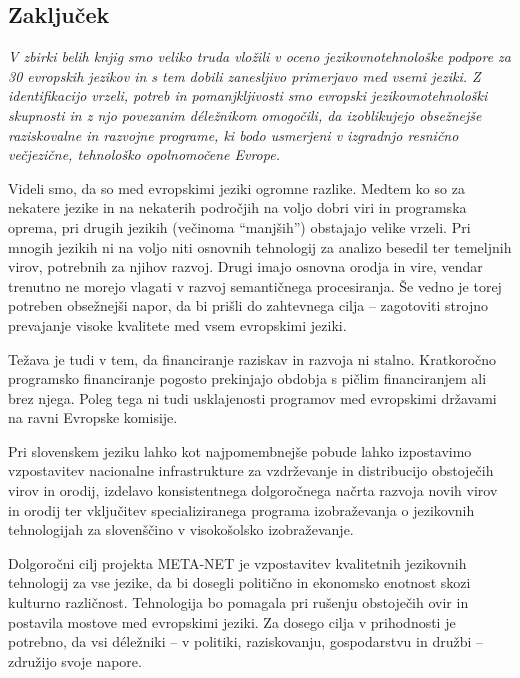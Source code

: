 \begin{multicols}{2}
\subsection{Zaključek}

\emph{V zbirki belih knjig smo veliko truda vložili v oceno jezikovnotehnološke podpore za 30 evropskih jezikov in s tem dobili zanesljivo primerjavo med vsemi jeziki. Z identifikacijo vrzeli, potreb in pomanjkljivosti smo evropski jezikovnotehnološki skupnosti in z njo povezanim déležnikom omogočili, da izoblikujejo obsežnejše raziskovalne in razvojne programe, ki bodo usmerjeni v izgradnjo resnično večjezične, tehnološko opolnomočene Evrope.}

Videli smo, da so med evropskimi jeziki ogromne razlike. Medtem ko so za nekatere jezike in na nekaterih področjih na voljo dobri viri in programska oprema, pri drugih jezikih (večinoma “manjših”) obstajajo velike vrzeli. Pri mnogih jezikih ni na voljo niti osnovnih tehnologij za analizo besedil ter temeljnih virov, potrebnih za njihov razvoj. Drugi imajo osnovna orodja in vire, vendar trenutno ne morejo vlagati v razvoj semantičnega procesiranja. Še vedno je torej potreben obsežnejši napor, da bi prišli do zah\-tevnega cilja – zagotoviti stroj\-no prevajanje visoke kvalitete med vsem evropskimi jeziki.

Težava je tudi v tem, da financiranje raziskav in razvoja ni stalno. Kratkoročno programsko financiranje pogosto prekinjajo obdobja s pičlim financiranjem ali brez njega. Poleg tega ni tudi usklajenosti programov med evropskimi državami na ravni Evropske komisije.

Pri slovenskem jeziku lahko kot naj\-pomembnejše pobude lahko izpostavimo vzpostavitev nacionalne infrastrukture za vzdrževanje in distribucijo obstoječih virov in orodij, izdelavo konsistentnega dolgoročnega načrta razvoja novih virov in orodij ter vključitev specializiranega programa izobraževanja o jezikovnih tehnologijah za slovenščino v visokošolsko izobraževanje.

Dolgoročni cilj projekta META-NET je vzpostavitev kvalitetnih jezikovnih tehnologij za vse jezike, da bi dosegli politično in ekonomsko enotnost skozi kulturno različnost. Tehnologija bo pomagala pri rušenju obstoječih ovir in postavila mostove med evropskimi jeziki. Za dosego cilja v prihodnosti  je potrebno, da vsi déležniki – v politiki, raziskovanju, gospodarstvu in družbi – združijo svoje napore.

\end{multicols}

